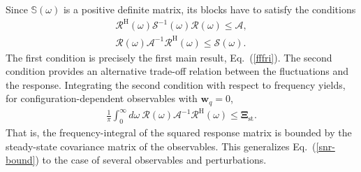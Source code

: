 \documentclass[aps,pre,twocolumn,superscriptaddress,notitlepage]{revtex4-2}
\newcommand{\bmc}[1]{\bm{\mathcal{#1}}}
\renewcommand{\eqref}[1]{Eq.~(\ref{#1})}
\begin{document}
Since $\mathbb{S}(\omega)$ is a positive definite matrix, its blocks have to satisfy the conditions
\begin{subequations}
\begin{gather}
\bmc{R}^\text{H}(\omega) \bmc{S}^{-1}(\omega) \bmc{R}(\omega) \leq \bmc{A}, \label{response-tradeoff-1} \\
\bmc{R}(\omega) \bmc{A}^{-1} \bmc{R}^\text{H}(\omega) \leq \bmc{S}(\omega) \label{response-tradeoff-2} .
\end{gather} \label{response-tradeoff}
\end{subequations}
The first condition is precisely the first main result, \eqref{fffri}.
The second condition provides an alternative trade-off relation between the fluctuations and the response.
Integrating the second condition with respect to frequency yields, for configuration-dependent observables with $\bm{w}_q = 0$,
\begin{align}
\frac{1}{\pi} \int_{0}^\infty d\omega \ \bmc{R}(\omega) \bmc{A}^{-1} \bmc{R}^\text{H}(\omega) \leq \bm{\Xi}_\text{st}.
\end{align}
That is, the frequency-integral of the squared response matrix is bounded by the steady-state covariance matrix of the observables.
This generalizes \eqref{snr-bound} to the case of several observables and perturbations.
\end{document}
